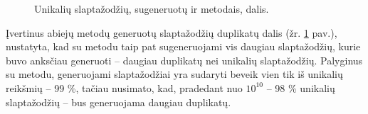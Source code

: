 \documentclass{VUMIFInfBakalaurinis}
\begin{document}
\begin{figure}[!ht]
  \begin{center}
  \end{center}
  \caption{
    Unikalių slaptažodžių, sugeneruotų  ir  
    metodais, dalis.
  }
  \label{plot:passgan-pcfg-duplicates}
\end{figure}
Įvertinus abiejų metodų generuotų slaptažodžių duplikatų dalis (žr. 
\ref{plot:passgan-pcfg-duplicates} pav.), nustatyta, kad su  
metodu taip pat sugeneruojami vis daugiau slaptažodžių, kurie buvo anksčiau 
generuoti -- daugiau duplikatų nei unikalių slaptažodžių. Palyginus 
 su  metodu,  generuojami 
slaptažodžiai yra sudaryti beveik vien tik iš unikalių reikšmių -- 99 \%, tačiau 
nusimato, kad, pradedant nuo $10^{10}$ -- 98 \% unikalių slaptažodžių -- bus 
generuojama daugiau duplikatų.
\end{document}
